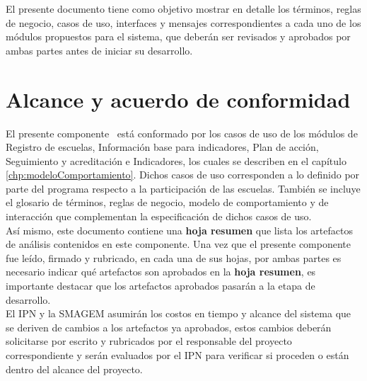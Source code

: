 El presente documento tiene como objetivo mostrar en detalle los términos, reglas de negocio, casos de uso, interfaces y mensajes correspondientes a cada uno de los módulos propuestos para el sistema, que deberán ser revisados y aprobados por ambas partes antes de iniciar su desarrollo.

	

\section{Alcance y acuerdo de conformidad}

   El presente componente \varCveDocumento\ está conformado por los casos de uso de los módulos de  Registro de escuelas, Información base para indicadores, Plan de acción, Seguimiento y acreditación e Indicadores, los cuales se describen en el capítulo \ref{chp:modeloComportamiento}. Dichos casos de uso corresponden a lo definido por parte del programa respecto a la participación de las escuelas. También se incluye el glosario de términos, reglas de negocio, modelo de comportamiento y de interacción que complementan la especificación de dichos casos de uso.\\

    Así mismo, este documento contiene una {\bf hoja resumen} que lista los artefactos de análisis contenidos en este componente. Una vez que el presente componente fue leído, firmado y rubricado, en cada una de sus hojas, por ambas partes es necesario indicar qué artefactos son aprobados en la {\bf hoja resumen}, es importante destacar que los artefactos aprobados pasarán a la etapa de desarrollo. \\

    El IPN y la SMAGEM asumirán los costos en tiempo y alcance del sistema que se deriven de cambios a los artefactos ya aprobados, estos cambios deberán solicitarse por escrito y rubricados por el responsable del proyecto correspondiente y serán evaluados por el IPN para verificar si proceden o están dentro del alcance del proyecto.

